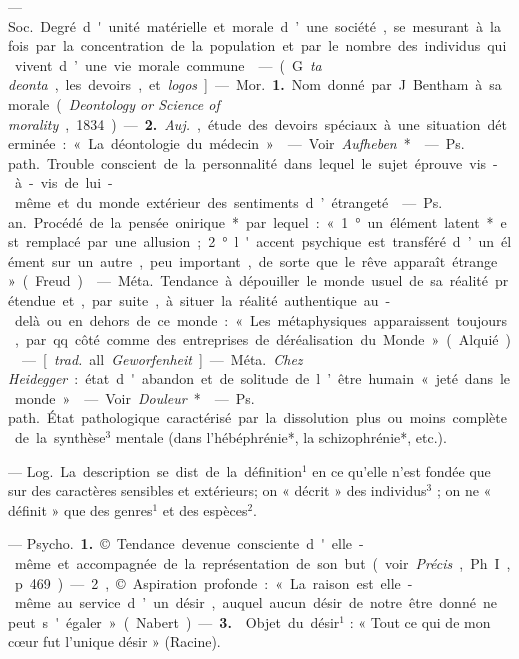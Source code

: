 \begin{itemize}[leftmargin=1cm, label=, itemsep=1pt]
 — \si{Soc.} Degré d'unité
matérielle et morale d’une société,
se mesurant à la fois par la concentration de la population et par le
nombre des individus qui vivent
d’une vie morale commune.

 — (G. {\it ta deonta}, les devoirs,
et {\it logos}] — \si{Mor.} {\bf 1.} Nom donné par
J. Bentham à sa morale ({\it Deontology
or Science of morality}, 1834). —
 {\bf 2.} {\it Auj.}, étude des devoirs spéciaux
à une situation déterminée : « La
déontologie du médecin ».

 — Voir {\it Aufheben}*.

 — \si{Ps. path.}
Trouble conscient de la personnalité
dans lequel le sujet éprouve vis-à-vis
de lui-même et du monde extérieur
des sentiments d’étrangeté.

 — \si{Ps. an.} Procédé de la
pensée onirique* par lequel : « 1° un
élément latent* est remplacé par
une allusion ; 2° l'accent psychique
est transféré d’un élément sur un
autre, peu important, de sorte que
le rêve apparaît étrange » (Freud).

 — \si{Méta.} Tendance à
dépouiller le monde usuel de sa
réalité prétendue et, par suite, à
situer la réalité authentique au-delà ou en dehors de ce monde :
« Les métaphysiques apparaissent
toujours, par qq. côté comme des
entreprises de déréalisation du
Monde » (Alquié).

 — [{\it trad.} all. {\it Geworfenheit}] —
\si{Méta.} {\it Chez Heidegger} : état d'abandon
et de solitude de l’être humain « jeté
dans le monde ».

 — Voir {\it Douleur}*.

 — \si{Ps. path.}
État pathologique caractérisé par la
dissolution plus ou moins complète
de la synthèse$^3$ mentale (dans
l'hébéphrénie*, la schizophrénie*,
etc.).

 — \si{Log.} La description
se dist. de la définition$^1$ en ce qu’elle
n’est fondée que sur des caractères
sensibles et extérieurs; on « décrit »
des individus$^3$ ; on ne « définit » que
des genres$^1$ et des espèces$^2$.

 — \si{Psycho.} {\bf 1.} © Tendance devenue consciente d'elle-même et
accompagnée de la représentation
de son but (voir  {\it Précis}, Ph. I, p. 469).
— 2, © Aspiration profonde : « La
raison est elle-même au service d’un
désir, auquel aucun désir de notre
être donné ne peut s'égaler » (Nabert). — {\bf 3.}  Objet du désir$^1$ : « Tout
ce qui de mon cœur fut l’unique
désir » (Racine).


\end{itemize}
